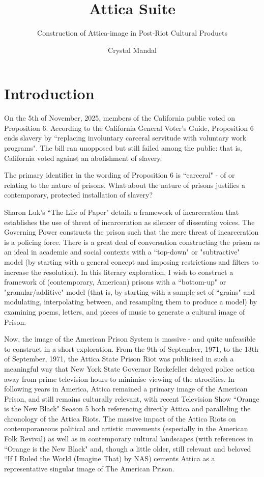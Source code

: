 \documentclass[14pt, letterpaper]{report}
\title{ \vspace*{-72pt} Attica Suite}
\subtitle{Construction of Attica-image in Post-Riot Cultural Products}
\author{Crystal Mandal}
\date{}
\begin{document}
\maketitle

	\section*{Introduction}

	On the 5th of November, 2025, members of the California 
	public voted on Proposition 6. According to the California 
	General Voter's Guide, Proposition 6 ends slavery by 
	``replacing involuntary carceral servitude  with voluntary work 
	programs". The bill ran unopposed but still failed among the 
	public: that is, California voted against an abolishment of 
        slavery.
	
	The primary identifier in the wording of Proposition 
	6 is ``carceral" - of or relating to the nature of prisons. 
	What about the nature of prisons justifies a contemporary,
	protected installation of slavery?
	
	Sharon Luk's ``The Life of Paper" details a framework of 
	incarceration that establishes the use of threat of incarceration 
	as silencer of dissenting voices. The Governing Power constructs 
	the prison such that the mere threat of incarceration is a 
	policing force. There is a great deal of conversation constructing 
	the prison as an ideal in academic and social contexts with a 
	``top-down" or "subtractive" model (by starting with a general 
	concept and imposing restrictions and filters to increase the 
	resolution). In this literary exploration, I wish to construct a 
	framework of (contemporary, American) prisons with a ``bottom-up" 
	or "granular/additive" model (that is, by starting with a sample 
	set of ``grains" and modulating, interpolating between, and 
	resampling them to produce a model) by examining poems, letters, 
	and pieces of music to generate a cultural image of Prison.
	
	Now, the image of the American Prison System is massive - 
	and quite unfeasible to construct in a short exploration. From 
	the 9th of September, 1971, to the 13th of September, 1971, the 
	Attica State Prison Riot was publicised in such a meaningful way 
	that New York State Governor Rockefeller delayed police action away 
	from prime television hours to minimise viewing of the atrocities. 
	In following years in America, Attica remained a primary image of 
	the American Prison, and still remains culturally relevant, with 
	recent Television Show ``Orange is the New Black" Season 5 both 
	referencing directly Attica and paralleling the chronology of the 
	Attica Riots. The massive impact of the Attica Riots on contemporaneous 
	political and artistic movements (especially in the American Folk 
	Revival) as well as in contemporary cultural landscapes (with references 
	in ``Orange is the New Black" and, though a little older, still 
	relevant and beloved ``If I Ruled the World (Imagine That) by NAS) 
	cements Attica as a representative singular image of The American 
	Prison. 
	
\end{document}

